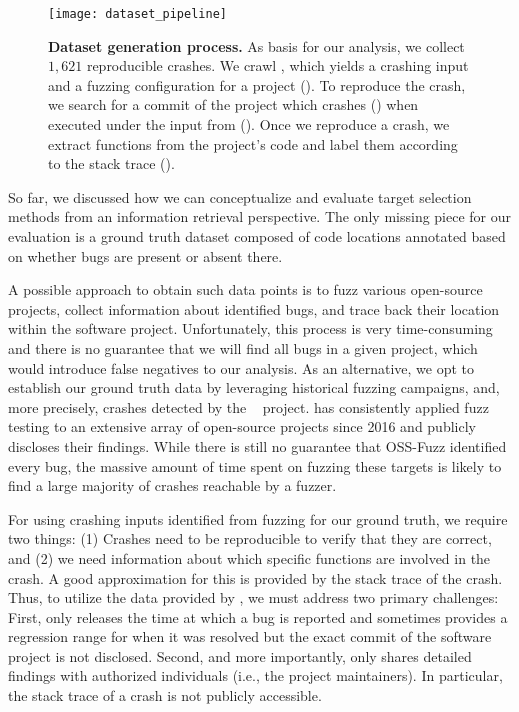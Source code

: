 \begin{figure}[t]
	\centering
	\texttt{[image: dataset\_pipeline]}
	\caption{\textbf{Dataset generation process.} \normalfont As basis for our analysis, we collect $1,621$ reproducible crashes. We crawl \ossfuzz, which yields a crashing input and a fuzzing configuration for a project (\stepone). To reproduce the crash, we search for a commit of the project which crashes (\steptwo) when executed under the input from \ossfuzz{} (\stepthree ). Once we reproduce a crash, we extract functions from the project's code and label them according to the stack trace (\stepfour).}
	\label{fig:dataset-process}
\end{figure}

So far, we discussed how we can conceptualize and evaluate target selection methods from an information retrieval perspective. The only missing piece for our evaluation is a ground truth dataset composed of code locations annotated based on whether bugs are present or absent there.

A possible approach to obtain such data points is to fuzz various open-source projects, collect information about identified bugs, and trace back their location within the software project. Unfortunately, this process is very time-consuming and there is no guarantee that we will find all bugs in a given project, which would introduce false negatives to our analysis. As an alternative, we opt to establish our ground truth data by leveraging historical fuzzing campaigns, and, more precisely, crashes detected by the \ossfuzz{}~\cite{Ser+23} project. \ossfuzz{} has consistently applied fuzz testing to an extensive array of open-source projects since 2016 and publicly discloses their findings. While there is still no guarantee that OSS-Fuzz identified every bug, the massive amount of time spent on fuzzing these targets is likely to find a large majority of crashes reachable by a fuzzer.

For using crashing inputs identified from fuzzing for our ground truth, we require two things: (1) Crashes need to be reproducible to verify that they are correct, and (2) we need information about which specific functions are involved in the crash. A good approximation for this is provided by the stack trace of the crash.
%
Thus, to utilize the data provided by \ossfuzz{}, we must address two primary challenges: First, \ossfuzz{} only releases the time at which a bug is reported and sometimes provides a regression range for when it was resolved but the exact commit of the software project is not disclosed. Second, and more importantly, \ossfuzz{} only shares detailed findings with authorized individuals (i.e., the project maintainers). In particular, the stack trace of a crash is not publicly accessible.

